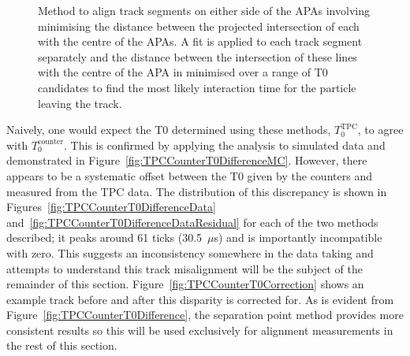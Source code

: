 \begin{figure}
\begin{subfigure}[t]{0.48\linewidth}
  \end{subfigure}
  \caption[Method to align track segments on either side of the APAs involving minimising the distance between the projected intersection of each with the centre of the APAs.]{Method to align track segments on either side of the APAs involving minimising the distance between the projected intersection of each with the centre of the APAs.  A fit is applied to each track segment separately and the distance between the intersection of these lines with the centre of the APA in minimised over a range of T0 candidates to find the most likely interaction time for the particle leaving the track.}
  \label{fig:APACrossingAlignmentSeparation}
\end{figure}

Naively, one would expect the T0 determined using these methods, $T_0^{\mathrm{TPC}}$, to agree with $T_0^{\mathrm{counter}}$.  This is confirmed by applying the analysis to simulated data and demonstrated in Figure~\ref{fig:TPCCounterT0DifferenceMC}.  However, there appears to be a systematic offset between the T0 given by the counters and measured from the TPC data.  The distribution of this discrepancy is shown in Figures~\ref{fig:TPCCounterT0DifferenceData} and~\ref{fig:TPCCounterT0DifferenceDataResidual} for each of the two methods described; it peaks around 61 ticks (30.5~$\mu$s) and is importantly incompatible with zero.  This suggests an inconsistency somewhere in the data taking and attempts to understand this track misalignment will be the subject of the remainder of this section.  Figure~\ref{fig:TPCCounterT0Correction} shows an example track before and after this disparity is corrected for.  As is evident from Figure~\ref{fig:TPCCounterT0Difference}, the separation point method provides more consistent results so this will be used exclusively for alignment measurements in the rest of this section.

